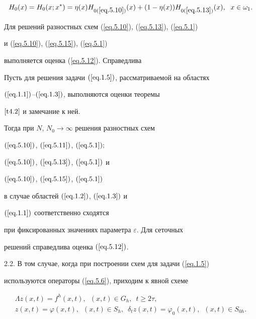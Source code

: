 \begin{equation}


\label{eq.5.15}


H_0(x)=H_0(x;x^*)=\eta(x)H_{0(\ref{eq.5.10})}(x)+


(1-\eta(x))H_{0(\ref{eq.5.13})}(x), \ \; x\in \omega_1.


\end{equation}





Для решений разностных схем (\ref{eq.5.10}), (\ref{eq.5.13}), (\ref{eq.5.1})


и (\ref{eq.5.10}), (\ref{eq.5.15}), (\ref{eq.5.1})


выполняется оценка (\ref{eq.5.12}). Справедлива





\begin{thms} \label{t5.2}


Пусть для решения задачи $(\ref{eq.1.5})$, рассматриваемой на областях


$(\ref{eq.1.1})$--$(\ref{eq.1.3})$, выполняются оценки теоремы


$\ref{t4.2}$ и замечание к ней.


Тогда при $N$, $N_0\to \infty$ решения разностных схем


$(\ref{eq.5.10})$, $(\ref{eq.5.11})$, $(\ref{eq.5.1});$


$(\ref{eq.5.10})$, $(\ref{eq.5.13})$, $(\ref{eq.5.1})$ и


$(\ref{eq.5.10})$, $(\ref{eq.5.15})$, $(\ref{eq.5.1})$


в случае областей $(\ref{eq.1.2})$, $(\ref{eq.1.3})$ и


$(\ref{eq.1.1})$ соответственно сходятся


при фиксированных значениях параметра $\varepsilon$. Для сеточных


решений справедлива оценка $(\ref{eq.5.12})$.


\end{thms}





2.2. В том случае, когда при построении схем для задачи (\ref{eq.1.5})


используются операторы (\ref{eq.5.6}), приходим к явной схеме


\begin{equation}


\label{eq.5.16}


\begin{array}{c}


\Lambda z(x, t)=f^h(x, t), \ \; (x, t)\in G_h, \ \; t\ge 2\tau,\\


z(x, t)=\varphi(x, t), \ \; (x, t)\in S_h,\ \;


\delta_t z(x, t)=\varphi_0(x, t), \ \; (x, t)\in S_{0h}.


\end{array}


\end{equation}


